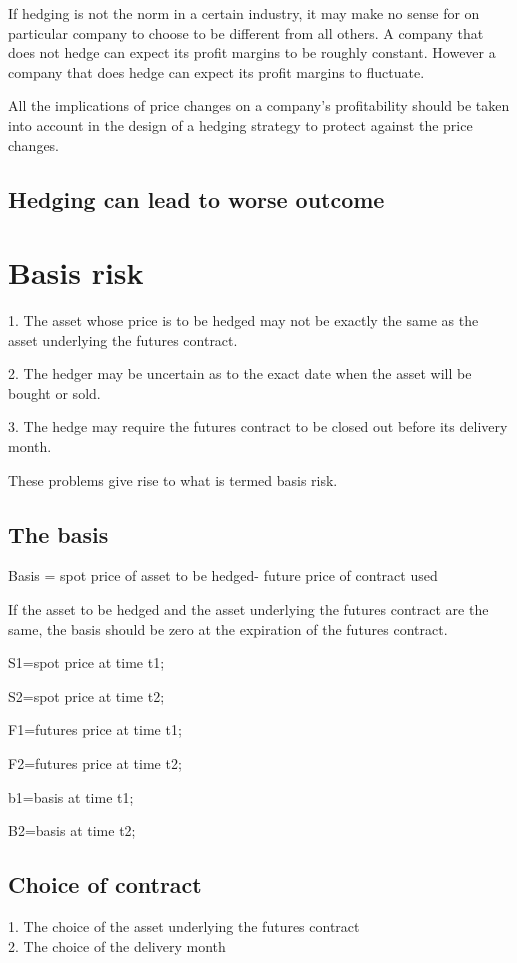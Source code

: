 \documentclass{article}
\begin{document}
If hedging is not the norm in a certain industry, it may make no sense for on particular company to choose to be different from all others. A company that does not hedge can expect its profit margins to be roughly constant. However a company that does hedge can expect its profit margins to fluctuate.

All the implications of price changes on a company's profitability should be taken into account in the design of a hedging strategy to protect against the price changes.

\subsection{Hedging can lead to worse outcome}

\section{Basis risk}
\hspace*{\fill}

1. The asset whose price is to be hedged may not be exactly the same as the asset underlying the futures contract.

2. The hedger may be uncertain as to the exact date when the asset will be bought or sold.

3. The hedge may require the futures contract to be closed out before its delivery month.

These problems give rise to what is termed basis risk.

\subsection{The basis}
\hspace*{\fill}

Basis = spot price of asset to be hedged- future price of contract used

If the asset to be hedged and the asset underlying the futures contract are the same, the basis should be zero at the expiration of the futures contract.

S1=spot price at time t1;

S2=spot price at time t2;

F1=futures price at time t1;

F2=futures price at time t2;

b1=basis at time t1;

B2=basis at time t2;

\subsection{Choice of contract}
1. The choice of the asset underlying the futures contract
\\
2. The choice of the delivery month
\\ \hspace*{\fill}
\end{document}
